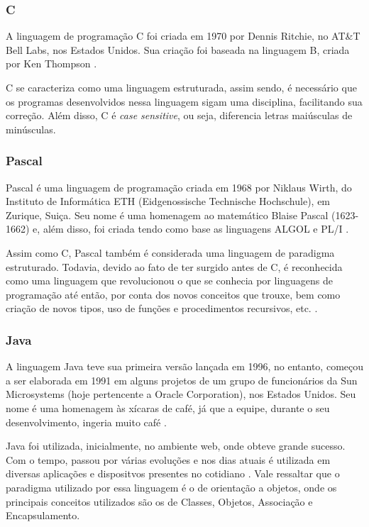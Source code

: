\documentclass[
	12pt,				%
	oneside,   	        %
	a4paper,			%
	english,			%
	french,				%
	spanish,			%
	brazil,				%
	]{pacotes/abntex2}
\begin{document}
        \subsubsection{C}
            A linguagem de programação C foi criada em 1970 por Dennis Ritchie, no AT&T Bell Labs, nos Estados Unidos. Sua criação foi baseada na linguagem B, criada por Ken Thompson \cite{art2}.
            
            C se caracteriza como uma linguagem estruturada, assim sendo, é necessário que os programas desenvolvidos nessa linguagem sigam uma disciplina, facilitando sua correção. Além disso, C é \textit{case sensitive}, ou seja, diferencia letras maiúsculas de minúsculas.
        
        \subsubsection{Pascal}
            Pascal é uma linguagem de programação criada em 1968 por Niklaus Wirth, do Instituto de Informática ETH (Eidgenossische Technische Hochschule), em Zurique, Suiça. Seu nome é uma homenagem ao matemático Blaise Pascal (1623-1662) e, além disso, foi criada tendo como base as linguagens ALGOL e PL/I \cite{art1}.
            
            Assim como C, Pascal também é considerada uma linguagem de paradigma estruturado. Todavia, devido ao fato de ter surgido antes de C, é reconhecida como uma linguagem que revolucionou o que se conhecia por linguagens de programação até então, por conta dos novos conceitos que trouxe, bem como criação de novos tipos, uso de funções e procedimentos recursivos, etc. \cite{art1}.
        
        \subsubsection{Java}
            A linguagem Java teve sua primeira versão lançada em 1996, no entanto, começou a ser elaborada em 1991 em alguns projetos de um grupo de funcionários da Sun Microsystems (hoje pertencente a Oracle Corporation), nos Estados Unidos. Seu nome é uma homenagem às xícaras de café, já que a equipe, durante o seu desenvolvimento, ingeria muito café \cite{art3}.
            
            Java foi utilizada, inicialmente, no ambiente web, onde obteve grande sucesso. Com o tempo, passou por várias evoluções e nos dias atuais é utilizada em diversas aplicações e dispositvos presentes no cotidiano \cite{art3}. Vale ressaltar que o paradigma utilizado por essa linguagem é o de orientação a objetos, onde os principais conceitos utilizados são os de Classes, Objetos, Associação e Encapsulamento.
        
\end{document}
